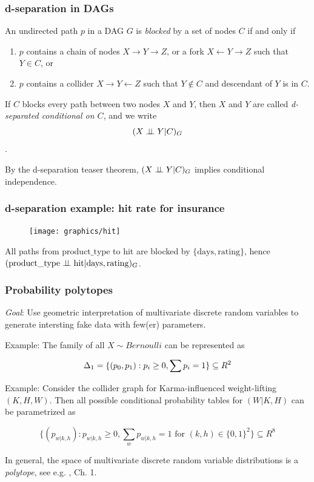 \begin{frame}
\frametitle{d-separation in DAGs}
\begin{definition}
An undirected path $p$ in a DAG $G$ is \emph{blocked} by a set of nodes $C$ if and only if
\begin{enumerate}
\item $p$ contains a chain of nodes $X \to Y \to Z$, or a fork $X \leftarrow Y \rightarrow Z$ such that $Y \in C$, or
\item $p$ contains a collider $X \to Y \leftarrow Z$ such that $Y \notin C$ and descendant of $Y$ is in $C$.
\end{enumerate}
\end{definition}

\begin{definition}
If $C$ blocks every path between two nodes $X$ and $Y$, then $X$ and $Y$ are called \emph{d-separated conditional on $C$}, and we write 
$$(X \perp\!\!\!\perp Y | C)_{G}$$.
\end{definition}

By the d-separation teaser theorem, $(X \perp\!\!\!\perp Y | C)_{G}$ implies conditional independence.\newline
\end{frame}


\begin{frame}
\frametitle{d-separation example: hit rate for insurance}
\begin{figure}[ht]
  \centering
  \texttt{[image: graphics/hit]}
\end{figure}

All paths from $\mathrm{product\_type}$ to $\mathrm{hit}$ are blocked by $\{\mathrm{days}, \mathrm{rating}\}$, hence $(\mathrm{product\_type} \perp\!\!\!\perp \mathrm{hit} | \mathrm{days}, \mathrm{rating})_G$.
\end{frame}


\begin{frame}
\frametitle{Probability polytopes}

\emph{Goal}: Use geometric interpretation of multivariate discrete random variables to generate intersting fake data with few(er) parameters.\newline

Example: The family of all $X \sim Bernoulli$ can be represented as

\begin{equation*}
\Delta_1 = \{(p_0, p_1): p_i \geq 0, \sum p_i = 1\} \subseteq R^2\newline
\end{equation*}

Example: Consider the collider graph for Karma-influenced weight-lifting $(K, H, W)$. Then all possible conditional probability tables for $(W | K, H)$ can be parametrized as 

\begin{equation*}
  \{(p_{w | k, h}): p_{w | k, h} \geq 0, \sum_w p_{w  | k,h} = 1 \textrm{ for } (k, h) \in \{0, 1\}^2\} \subseteq R^8
\end{equation*}

In general, the space of multivariate discrete random variable distributions is a \emph{polytope}, see e.g. \cite{drton2008lectures}, Ch. 1.
\end{frame}


